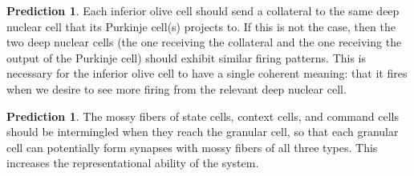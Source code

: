 \documentclass{article}
\theoremstyle{definition}
\newtheorem{pred}[thm]{Prediction}
\begin{document}
\begin{pred}
Each inferior olive cell should send a collateral to the same deep
nuclear cell that its Purkinje cell(s) projects to. If this is not the
case, then the two deep nuclear cells (the one receiving the
collateral and the one receiving the output of the Purkinje cell)
should exhibit similar firing patterns. This is necessary for the
inferior olive cell to have a single coherent meaning: that it fires
when we desire to see more firing from the relevant deep nuclear cell.
\end{pred}

\begin{pred}
The mossy fibers of state cells, context cells, and command cells
should be intermingled when they reach the granular cell, so that each
granular cell can potentially form synapses with mossy fibers of all
three types. This increases the representational ability of the
system.
\end{pred}
\end{document}

